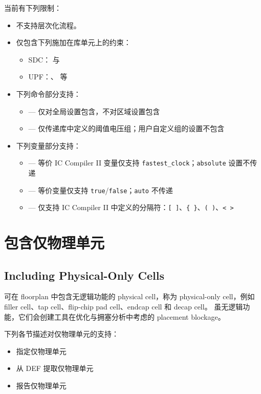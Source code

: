  当前有下列限制：
\begin{itemize}
  \item 不支持层次化流程。
  \item 仅包含下列施加在库单元上的约束：
  \begin{itemize}
    \item SDC： 与 
    \item UPF：、 等
  \end{itemize}
  \item 下列命令部分支持：
  \begin{itemize}
    \item {} —  仅对全局设置包含，不对区域设置包含
    \item {} — 仅传递库中定义的阈值电压组；用户自定义组的设置不包含
  \end{itemize}
  \item 下列变量部分支持：
  \begin{itemize}
    \item {} — 等价 IC Compiler II 变量仅支持 \texttt{fastest\_clock}；\texttt{absolute} 设置不传递
    \item {} — 等价变量仅支持 \texttt{true}/\texttt{false}；\texttt{auto} 不传递
    \item {} — 仅支持 IC Compiler II 中定义的分隔符：\texttt{[ ]}、\texttt{\{ \}}、\texttt{( )}、\texttt{< >}
  \end{itemize}
\end{itemize}

\section{包含仅物理单元}
\subsection*{Including Physical-Only Cells}

可在 floorplan 中包含无逻辑功能的 physical cell，称为 physical-only cell，例如 filler cell、tap cell、flip-chip pad cell、endcap cell 和 decap cell。
虽无逻辑功能，它们会创建工具在优化与拥塞分析中考虑的 placement blockage。

下列各节描述对仅物理单元的支持：
\begin{itemize}
  \item 指定仅物理单元
  \item 从 DEF 提取仅物理单元
  \item 报告仅物理单元
\end{itemize}

